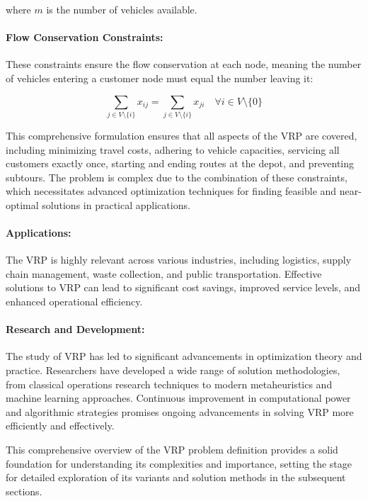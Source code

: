 \documentclass[
]{article}
\begin{document}
where \( m \) is the number of vehicles available.

\paragraph{Flow Conservation Constraints:}
These constraints ensure the flow conservation at each node, meaning the number of vehicles entering a customer node must equal the number leaving it:

\begin{equation}
  \sum_{j \in V \setminus \{i\}} x_{ij} = \sum_{j \in V \setminus \{i\}} x_{ji} \quad \forall i \in V \setminus \{0\}
\end{equation}

This comprehensive formulation ensures that all aspects of the VRP are covered, including minimizing travel costs, adhering to vehicle capacities, servicing all customers exactly once, starting and ending routes at the depot, and preventing subtours. The problem is complex due to the combination of these constraints, which necessitates advanced optimization techniques for finding feasible and near-optimal solutions in practical applications.



\paragraph{Applications:}
The VRP is highly relevant across various industries, including logistics, supply chain management, waste collection, and public transportation. Effective solutions to VRP can lead to significant cost savings, improved service levels, and enhanced operational efficiency.


\paragraph{Research and Development:}
The study of VRP has led to significant advancements in optimization theory and practice. Researchers have developed a wide range of solution methodologies, from classical operations research techniques to modern metaheuristics and machine learning approaches. Continuous improvement in computational power and algorithmic strategies promises ongoing advancements in solving VRP more efficiently and effectively.

This comprehensive overview of the VRP problem definition provides a solid foundation for understanding its complexities and importance, setting the stage for detailed exploration of its variants and solution methods in the subsequent sections.
\end{document}

